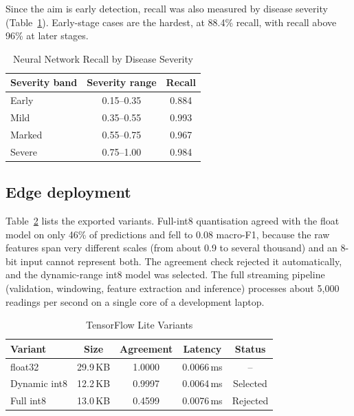 \documentclass[conference]{IEEEtran}
\begin{document}
Since the aim is early detection, recall was also measured by disease severity
(Table~\ref{tab:severity}). Early-stage cases are the hardest, at 88.4\% recall,
with recall above 96\% at later stages.

\begin{table}[t]
\caption{Neural Network Recall by Disease Severity}
\label{tab:severity}
\centering
\footnotesize
\begin{tabular}{@{}lcc@{}}
\toprule
\textbf{Severity band} & \textbf{Severity range} & \textbf{Recall} \\
\midrule
Early & 0.15--0.35 & 0.884 \\
Mild & 0.35--0.55 & 0.993 \\
Marked & 0.55--0.75 & 0.967 \\
Severe & 0.75--1.00 & 0.984 \\
\bottomrule
\end{tabular}
\end{table}

\subsection{Edge deployment}
Table~\ref{tab:tflite} lists the exported variants. Full-int8 quantisation
agreed with the float model on only 46\% of predictions and fell to 0.08
macro-F1, because the raw features span very different scales (from about 0.9
to several thousand) and an 8-bit input cannot represent both. The agreement
check rejected it automatically, and the dynamic-range int8 model was selected.
The full streaming pipeline (validation, windowing, feature extraction and
inference) processes about 5{,}000 readings per second on a single core of a
development laptop.

\begin{table}[t]
\caption{TensorFlow Lite Variants}
\label{tab:tflite}
\centering
\footnotesize
\begin{tabular}{@{}lcccc@{}}
\toprule
\textbf{Variant} & \textbf{Size} & \textbf{Agreement} & \textbf{Latency} & \textbf{Status} \\
\midrule
float32 & 29.9\,KB & 1.0000 & 0.0066\,ms & -- \\
Dynamic int8 & 12.2\,KB & 0.9997 & 0.0064\,ms & Selected \\
Full int8 & 13.0\,KB & 0.4599 & 0.0076\,ms & Rejected \\
\bottomrule
\end{tabular}
\end{table}
\end{document}
